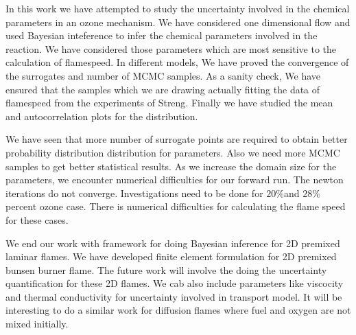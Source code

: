 \noindent In this work we have attempted to study the uncertainty involved in the chemical parameters in an ozone mechanism. We have considered one dimensional flow and used Bayesian inteference to infer the chemical parameters involved in the reaction. We have considered those parameters which are most sensitive to the calculation of flamespeed. In different models, We have proved the convergence of the surrogates and  number of MCMC samples. As a sanity check, We have ensured that the samples which we are drawing actually fitting the data of flamespeed from the experiments of Streng\cite{Streng}. Finally we have studied the mean and autocorrelation plots for the distribution.


\noindent We have seen that more number of surrogate points are required to obtain better probability distribution distribution for parameters. Also we need more MCMC samples to get better statistical results. As we increase the domain size for the parameters, we encounter numerical difficulties for our forward run. The newton iterations do not converge. Investigations need to be done for $20 \% $and $ 28 \% $ percent ozone case. There is numerical difficulties for calculating the flame speed for these cases.

\noindent We end our work with  framework for doing Bayesian inference for 2D premixed laminar flames. We have developed finite element formulation for 2D premixed bunsen burner flame. The future work will involve the doing the uncertainty quantification for these 2D flames. We cab also include parameters like viscocity and  thermal conductivity for uncertainty involved in transport model. It will be interesting to do a similar work for diffusion flames where fuel and oxygen are not mixed initially.

\noindent

